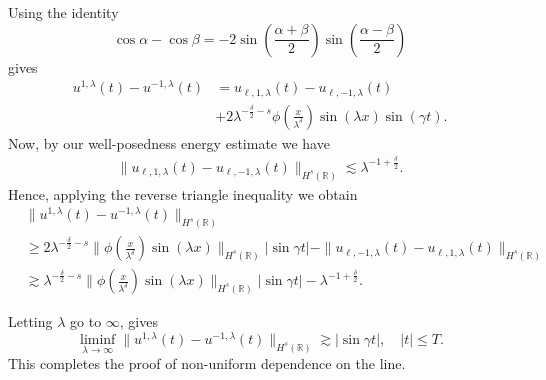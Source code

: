 \documentclass{beamer}
\newcommand{\rr}{\mathbb{R}}
\begin{document}
\begin{frame}
%
Using the identity $$
\cos \alpha -\cos \beta
=
-2
\sin(\frac{\alpha + \beta}{2})
\sin(\frac{\alpha - \beta}{2})
$$
gives
%
%
\begin{equation*}
\label{apple80}
\begin{split}
u^{1,\lambda}(t)
-
u^{- 1,\lambda}(t)
& =
u_{\ell,1,\lambda}(t) - u_{\ell,-1,\lambda}(t)
\\
& + 
2\lambda^{-\frac{\delta}{2}-s}
\phi\left( \frac{x}{\lambda^\delta} \right)\sin(\lambda x) \sin(\gamma t).
\end{split}
\end{equation*}
%
%
Now, by our well-posedness energy estimate we have
%
%
\begin{equation*}
\begin{split}
\|u_{\ell,1,\lambda}(t) - u_{\ell,-1,\lambda}(t)\|_{H^s(\rr)} \lesssim
\lambda^{-1 + \frac{\delta}{2}}.
\end{split}
\end{equation*}
%
%
Hence, applying the reverse triangle inequality we 
obtain
%
%
\begin{equation*} 
\begin{split}
& \|
u^{1,\lambda}(t)
-
u^{- 1,\lambda}(t)
\|_{H^s(\rr)}
\\
& \ge 2 \lambda^{-\frac{\delta}{2}-s} \|\phi\left(
\frac{x}{\lambda^\delta} \right) \sin(\lambda x) \|_{H^s(\rr)} |\sin \gamma 
t|
- \|u_{\ell,-1,\lambda}(t) - u_{\ell,1,\lambda}(t)\|_{H^s(\rr)} \\
& \gtrsim \lambda^{-\frac{\delta}{2}-s} \|\phi\left(
\frac{x}{\lambda^\delta} \right ) \sin(\lambda x) \|_{H^s(\rr)} |\sin 
\gamma t| -
\lambda^{-1 + \frac{\delta}{2}}.
\end{split}
\end{equation*}
%
%
%
\end{frame}

\begin{frame}
%
Letting $\lambda$ go to $\infty$,  
gives
%
%
%
%
\begin{equation*} \label{apple91}
\liminf_{\lambda \to\infty}
\|
u^{1,\lambda}(t)
-
u^{- 1,\lambda}(t)
\|_{H^s(\rr)}
\gtrsim
|\sin \gamma t|, \quad |t| \le T.
\end{equation*}
%
%
This completes 
the proof of non-uniform dependence on the line. \qquad \qedsymbol
\end{frame}
\end{document}

